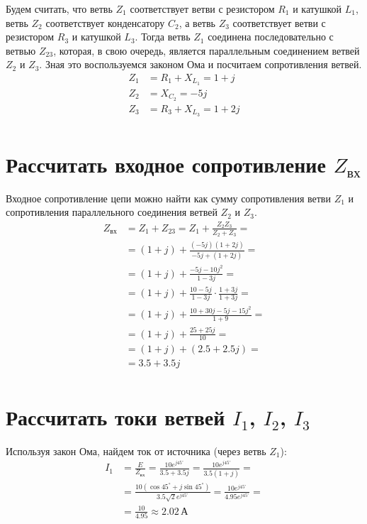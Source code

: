 \documentclass[12pt]{article}
\begin{document}
Будем считать, что ветвь $Z_1$ соответствует ветви с 
резистором $R_1$ и катушкой $L_1$, ветвь $Z_2$ соответствует 
конденсатору $C_2$, а ветвь $Z_3$ соответствует ветви с 
резистором $R_3$ и катушкой $L_3$. Тогда ветвь $Z_1$ 
соединена последовательно с ветвью $Z_{23}$, которая, в свою 
очередь, является параллельным соединением ветвей $Z_2$ и $Z_3$.
Зная это воспользуемся законом Ома и посчитаем сопротивления
ветвей.
\begin{equation*}
  \begin{aligned}
    Z_1 &= R_1 + X_{L_1} = 1 + j \\
    Z_2 &= X_{C_2} = -5j \\
    Z_3 &= R_3 + X_{L_3} = 1 + 2j \\
  \end{aligned}
\end{equation*}

\section{Рассчитать входное сопротивление $Z_{\text{вх}}$}

Входное сопротивление цепи можно найти как сумму сопротивления
ветви $Z_1$ и сопротивления параллельного соединения ветвей $Z_2$ и $Z_3$.
\begin{equation*}
  \begin{aligned}
    Z_{\text{вх}} &= Z_1 + Z_{23} = Z_1 + \frac{Z_2 Z_3}{Z_2 + Z_3} = \\
    &= (1 + j) + \frac{(-5j)(1 + 2j)}{-5j + (1 + 2j)} = \\
    &= (1 + j) + \frac{-5j - 10j^2}{1 - 3j} = \\
    &= (1 + j) + \frac{10 - 5j}{1 - 3j} \cdot \frac{1 + 3j}{1 + 3j} = \\
    &= (1 + j) + \frac{10 + 30j - 5j - 15j^2}{1 + 9} = \\
    &= (1 + j) + \frac{25 + 25j}{10} = \\
    &= (1 + j) + (2.5 + 2.5j) = \\
    &= 3.5 + 3.5j \\
  \end{aligned}
\end{equation*}

\section{Рассчитать токи ветвей $I_1$, $I_2$, $I_3$}

Используя закон Ома, найдем ток от источника (через ветвь $Z_1$):
\begin{equation*}
  \begin{aligned}
    I_1 &= \frac{E}{Z_{\text{вх}}} = \frac{10e^{j45^\circ}}{3.5 + 3.5j} = \frac{10e^{j45^\circ}}{3.5(1 + j)} = \\
    &= \frac{10(\cos 45^\circ + j\sin 45^\circ)}{3.5\sqrt{2}e^{j45^\circ}} = \frac{10e^{j45^\circ}}{4.95e^{j45^\circ}} = \\
    &= \frac{10}{4.95} \approx 2.02\,\text{А}
  \end{aligned}
\end{equation*}
\end{document}
